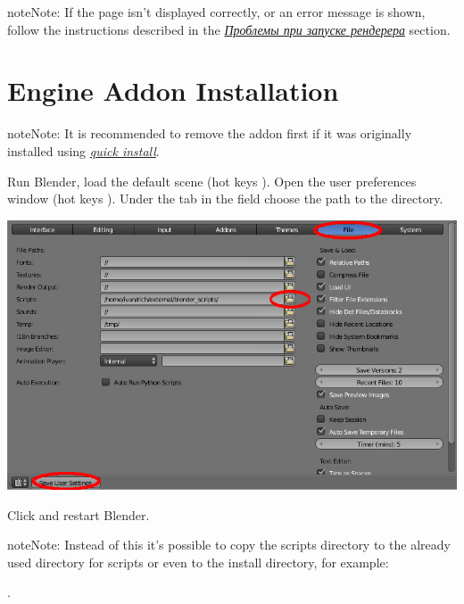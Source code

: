 \documentclass[a4paper,12pt,oneside]{sphinxmanual}
\begin{document}
\begin{DUlineblock}{0em}
\item[] 
\end{DUlineblock}

\begin{notice}{note}{Note:}
If the page isn't displayed correctly, or an error message is shown, follow the instructions described in the {\hyperref[problems_and_solutions:renderer-not-working]{\emph{Проблемы при запуске рендерера}}} section.
\end{notice}


\section{Engine Addon Installation}
\label{setup:getting-started-addon}\label{setup:id5}\label{setup:index-3}
\begin{notice}{note}{Note:}
It is recommended to remove the addon first if it was originally installed using {\hyperref[first_steps:first-steps]{\emph{quick install}}}.
\end{notice}

Run Blender, load the default scene  (hot keys ). Open the user preferences window  (hot keys ). Under the  tab in the  field choose the path to the  directory.

{\hfill\includegraphics[width=1.000\linewidth]{user_preferences_scripts_path.jpg}\hfill}

Click  and restart Blender.

\begin{notice}{note}{Note:}
Instead of this it's possible to copy the scripts directory  to the already used directory for scripts or even to the install directory, for example:

.
\end{notice}
\end{document}
